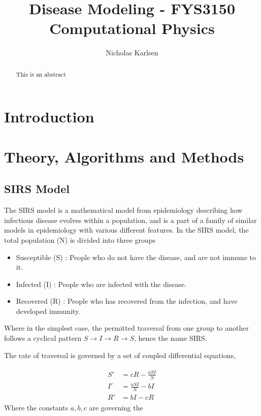 \documentclass[10pt,showpacs,preprintnumbers,amsmath,amssymb,nofootinbib,aps,prl,twocolumn,groupedaddress,superscriptaddress,showkeys]{revtex4-1}
\begin{document}
\title{Disease Modeling - FYS3150 Computational Physics}
\author{Nicholas Karlsen}


\begin{abstract}
  This is an abstract
\end{abstract}

\maketitle


\section{Introduction}

\section{Theory, Algorithms and Methods}
  \subsection{SIRS Model}

    The SIRS model is a mathematical model from epidemiology describing how infectious disease evolves within a population, and is a part of a family of similar models in epidemiology with various different features. In the SIRS model, the total population (N) is divided into three groups

    \begin{itemize}
      \item Susceptible (S) : People who do not have the disease, and are not immune to it.
      \item Infected (I) : People who are infected with the disease.
      \item Recovered (R) : People who has recovered from the infection, and have developed immunity.
    \end{itemize}

    Where in the simplest case, the permitted traversal from one group to another follows a cyclical pattern $S \rightarrow I \rightarrow R \rightarrow S$, hence the name SIRS.

    The rate of traversal is governed by a set of coupled differential equations,

    \begin{align}
      \begin{split}
        S' &= cR - \frac{aSI}{N} \\
        I' &= \frac{aSI}{N} - bI \\
        R' &= bI - cR 
        \label{eqn:transition rates, basic}
      \end{split}
    \end{align}
    Where the constants $a,b,c$ are governing the
\end{document}
